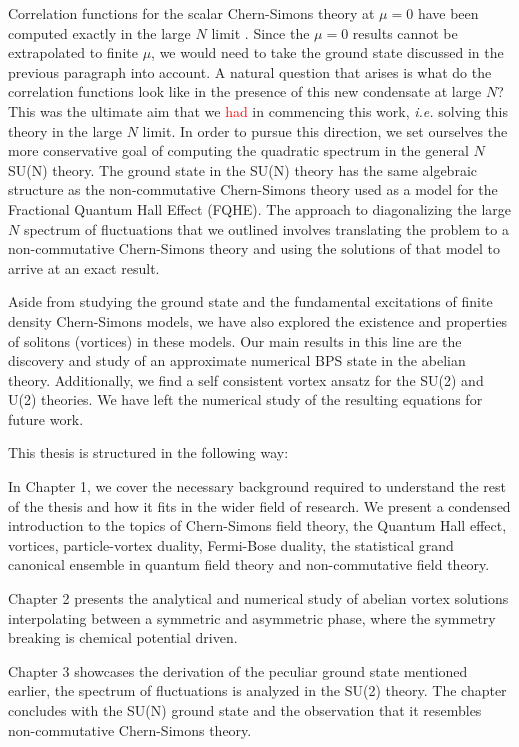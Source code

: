 Correlation functions for the scalar Chern-Simons theory at $\mu=0$ have been computed exactly in the large $N$ limit \cite{Aharony:2012nh}. Since the $\mu =0$ results cannot be extrapolated to finite $\mu$, we would need to take the ground state discussed in the previous paragraph into account. A natural question that arises is what do the correlation functions look like in the presence of this new condensate at large $N$? This was the ultimate aim that we \textcolor{red}{had} in commencing this work, \textit{i.e.} solving this theory in the large $N$ limit. In order to pursue this direction, we set ourselves the more conservative goal of computing the quadratic spectrum in the general $N$ SU(N) theory. The ground state in the SU(N) theory has the same algebraic structure as the non-commutative Chern-Simons theory used as a model for the Fractional Quantum Hall Effect (FQHE). The approach to diagonalizing the large $N$ spectrum of fluctuations that we outlined involves translating the problem to a non-commutative Chern-Simons theory and using the solutions of that model to arrive at an exact result.

    Aside from studying the ground state and the fundamental excitations of finite density Chern-Simons models, we have also explored the existence and properties of solitons (vortices) in these models. Our main results in this line are the discovery and study of an approximate numerical BPS state in the abelian theory. Additionally, we find a self consistent vortex ansatz for the SU(2) and U(2) theories. We have left the numerical study of the resulting equations for future work.

    This thesis is structured in the following way:

    In Chapter 1, we cover the necessary background required to understand the rest of the thesis and how it fits in the wider field of research. We present a condensed introduction to the topics of Chern-Simons field theory, the Quantum Hall effect, vortices, particle-vortex duality, Fermi-Bose duality, the statistical grand canonical ensemble in quantum field theory and non-commutative field theory.

    Chapter 2 presents the analytical and numerical study of abelian vortex solutions interpolating between a symmetric and asymmetric phase, where the symmetry breaking is chemical potential driven.

    Chapter 3 showcases the derivation of the peculiar ground state mentioned earlier, the spectrum of fluctuations is analyzed in the SU(2) theory. The chapter concludes with the SU(N) ground state and the observation that it resembles non-commutative Chern-Simons theory.


